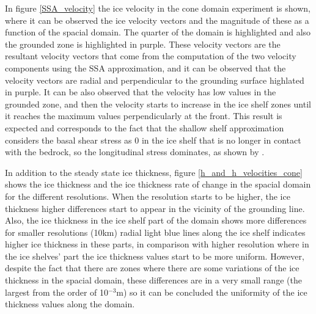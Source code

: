 \documentclass{article}
\begin{document}
In figure \ref{SSA_velocity} the ice velocity in the cone domain experiment is shown, where it can be observed the ice velocity vectors and the magnitude of these as a function of the spacial domain. The quarter of the domain is highlighted and also the grounded zone is highlighted in purple. These velocity vectors are the resultant velocity vectors that come from the computation of the two velocity components using the SSA approximation, and it can be observed that the velocity vectors are radial and perpendicular to the grounding surface highlated in purple. It can be also observed that the velocity has low values in the grounded zone, and then the velocity starts to increase in the ice shelf zones until it reaches the maximum values perpendicularly at the front. This result is expected and corresponds to the fact that the shallow shelf approximation considers the basal shear stress as 0 in the ice shelf that is no longer in contact with the bedrock, so the longitudinal stress dominates, as shown by \cite{allison2009ice}.

In addition to the steady state ice thickness, figure \ref{h_and_h_velocities_cone} shows the ice thickness and the ice thickness rate of change in the spacial domain for the different resolutions. When the resolution starts to be higher, the ice thickness higher differences start to appear in the vicinity of the grounding line. Also, the ice thickness in the ice shelf part of the domain shows more differences for smaller resolutions (10km) radial light blue lines along the ice shelf indicates higher ice thickness in these parts, in comparison with higher resolution where in the ice shelves' part the ice thickness values start to be more uniform. However, despite the fact that there are zones where there are some variations of the ice thickness in the spacial domain, these differences are in a very small range (the largest from the order of 10$^{-3}$m) so it can be concluded the uniformity of the ice thickness values along the domain.
\end{document}
